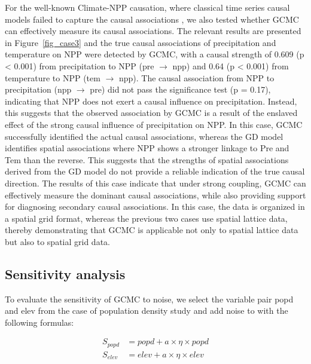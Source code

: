 \documentclass[authoryear,preprint,review,12pt]{elsarticle}
\begin{document}
For the well-known Climate-NPP causation, where classical time series causal models failed to capture the causal associations \citep{gao2022tscess,gao2023gccm}, we also tested whether GCMC can effectively measure its causal associations. The relevant results are presented in Figure~\ref{fig_case3} and the true causal associations of precipitation and temperature on NPP were detected by GCMC, with a causal strength of 0.609 (p < 0.001) from precipitation to NPP (pre  \(\rightarrow\) npp) and 0.64 (p < 0.001) from temperature to NPP (tem  \(\rightarrow\) npp). The causal association from NPP to precipitation (npp \(\rightarrow\) pre) did not pass the significance test (p = 0.17), indicating that NPP does not exert a causal influence on precipitation. Instead, this suggests that the observed association by GCMC is a result of the enslaved effect of the strong causal influence of precipitation on NPP. In this case, GCMC successfully identified the actual causal associations, whereas the GD model identifies spatial associations where NPP shows a stronger linkage to Pre and Tem than the reverse. This suggests that the strengths of spatial associations derived from the GD model do not provide a reliable indication of the true causal direction. The results of this case indicate that under strong coupling, GCMC can effectively measure the dominant causal associations, while also providing support for diagnosing secondary causal associations. In this case, the data is organized in a spatial grid format, whereas the previous two cases use spatial lattice data, thereby demonstrating that GCMC is applicable not only to spatial lattice data but also to spatial grid data.

\subsection{Sensitivity analysis}\label{sensitivity}

To evaluate the sensitivity of GCMC to noise, we select the variable pair popd and elev from the case of population density study and add noise to with the following formulas:

\begin{equation}\label{eq-sensitivity}
\begin{aligned}
S_{popd} &= popd + a \times \eta \times popd \\
S_{elev} &= elev + a \times \eta \times elev
\end{aligned}
\end{equation}
\end{document}
